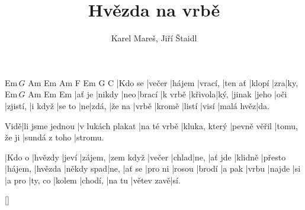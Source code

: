 \documentclass{song}
\title{Hvězda na vrbě}
\author{Karel Mareš, Jiří Štaidl}
\begin{document}
\strophe
Em\,$G$ Am     Em     Am      F       Em     G   C
|Kdo se |večer |hájem |vrací, |ten ať |klopí |zra|ky,
Em\,$G$  Am     Em    Em     
|ať je\+ |nikdy |neo\,|brací |k vrbě\+ |křivola|ký,
|jinak\+ |jeho |oči\+ |zjistí, |i když |se to |ne|zdá,
|že na\+ |vrbě |kromě |listí |visí\+ |malá hvěz|da.
\endstrophe


Vidě|li jsme jednou |v lukách
plakat |na té vrbě |kluka,
který |pevně věřil |tomu,
že ji |sundá z toho |stromu.
\endstrophe

\strophe
|Kdo o |hvězdy |jeví |zájem, |zem když |večer |chlad|ne,
|ať jde |klidně |přesto |hájem, |hvězda\+ |někdy spad|ne,
|ať se\+ |pro ni |rosou |brodí |a pak |vrbu |najde |si
|a pro\+ |ty, co |kolem |chodí, |na tu |větev zavě|sí.
\strophe

\ref{}
\end{document}

